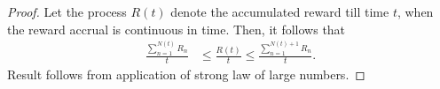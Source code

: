 \documentclass[a4paper,10pt,english]{article}
\begin{document}
\begin{proof}
Let the process $R(t)$ denote the accumulated reward till time $t$, when the reward accrual is continuous in time. 
Then, it follows that %
\begin{align*}
\frac{\sum_{n=1}^{N(t)}R_n}{t} &\leq  \frac{R(t)}{t} \leq \frac{\sum_{n=1}^{N(t)+1}R_n}{t}.
\end{align*}
Result follows from application of strong law of large numbers. 
\end{proof} 
\end{document}
